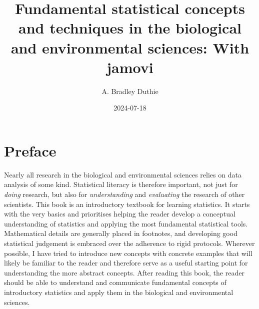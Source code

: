 \documentclass[
  openany]{krantz}
\title{Fundamental statistical concepts and techniques in the biological and environmental sciences: With jamovi}
\author{A. Bradley Duthie}
\date{2024-07-18}
\begin{document}
\maketitle


\thispagestyle{empty}

\begin{center}

\end{center}

\setlength{\abovedisplayskip}{-5pt}
\setlength{\abovedisplayshortskip}{-5pt}

\setcounter{tocdepth}{1}
\setcounter{page}{3}
\tableofcontents

\hypertarget{preface}{%
\chapter*{Preface}\label{preface}}


Nearly all research in the biological and environmental sciences relies on data analysis of some kind.
Statistical literacy is therefore important, not just for \emph{doing} research, but also for \emph{understanding} and \emph{evaluating} the research of other scientists.
This book is an introductory textbook for learning statistics.
It starts with the very basics and prioritises helping the reader develop a conceptual understanding of statistics and applying the most fundamental statistical tools.
Mathematical details are generally placed in footnotes, and developing good statistical judgement is embraced over the adherence to rigid protocols.
Wherever possible, I have tried to introduce new concepts with concrete examples that will likely be familiar to the reader and therefore serve as a useful starting point for understanding the more abstract concepts.
After reading this book, the reader should be able to understand and communicate fundamental concepts of introductory statistics and apply them in the biological and environmental sciences.
\end{document}
